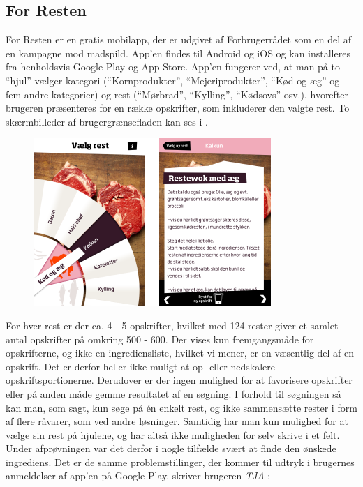 \subsection{For Resten}
\label{subsec:forresten}

For Resten er en gratis mobilapp, der er udgivet af Forbrugerrådet som en del af en kampagne mod madspild. App’en findes til Android og iOS og kan installeres fra henholdsvis Google Play og App Store. App’en fungerer ved, at man på to ``hjul'' vælger kategori (``Kornprodukter'', ``Mejeriprodukter'', ``Kød og æg'' og fem andre kategorier) og rest (\fx ``Mørbrad'', ``Kylling'', ``Kødsovs'' osv.), hvorefter brugeren præsenteres for en række opskrifter, som inkluderer den valgte rest. To skærmbilleder af brugergrænsefladen kan ses i .

\begin{figure}[H]
\centering
\includegraphics[scale=0.7]{billeder/forbilleder/forresten.png}
\label{fig:forresten}
\end{figure}

For hver rest er der ca. 4 - 5 opskrifter, hvilket med 124 rester giver et samlet antal opskrifter på omkring 500 - 600. Der vises kun fremgangsmåde for opskrifterne, og ikke en ingrediensliste, hvilket vi mener, er en væsentlig del af en opskrift. Det er derfor heller ikke muligt at op- eller nedskalere opskriftsportionerne. Derudover er der ingen mulighed for at favorisere opskrifter eller på anden måde gemme resultatet af en søgning. I forhold til søgningen så kan man, som sagt, kun søge på én enkelt rest, og ikke sammensætte rester i form af flere råvarer, som ved andre løsninger. Samtidig har man kun mulighed for at vælge sin rest på hjulene, og har altså ikke muligheden for selv skrive i et felt. Under afprøvningen var det derfor i nogle tilfælde svært at finde den ønskede ingrediens. Det er de samme problemstillinger, der kommer til udtryk i brugernes anmeldelser af app’en på Google Play. \Fx skriver brugeren \textit{TJA} \cite{tja}:

